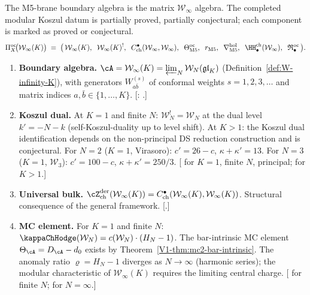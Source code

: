 \begin{conjecture}
\label{comp:platonic-M5}
The M5-brane boundary algebra is the matrix $\mathcal{W}_\infty$
algebra. The completed modular Koszul datum is partially proved,
partially conjectural; each component is marked as proved or conjectural.
\begin{equation}\label{eq:platonic-M5}
\Pi^{\mathrm{oc}}_X\!\bigl(\mathcal{W}_\infty(K)\bigr)
\;=\;
\bigl(\,
\mathcal{W}_\infty(K),\;\;
\mathcal{W}_\infty(K)^!,\;\;
C^\bullet_{\mathrm{ch}}(\mathcal{W}_\infty, \mathcal{W}_\infty),\;\;
\Theta^{\mathrm{oc}}_{\mathrm{M5}},\;\;
r_{\mathrm{M5}},\;\;
\nabla^{\mathrm{hol}}_{\mathrm{M5}},\;\;
\HH^{\mathrm{ch}}_\bullet(\mathcal{W}_\infty),\;\;
\mathfrak{R}^{\mathrm{oc}}_\bullet
\,\bigr).
\end{equation}
\begin{enumerate}[label=\textup{(\roman*)},nosep]
\item \textbf{Boundary algebra.}
 $\cA = \mathcal{W}_\infty(K) = \varprojlim_N \mathcal{W}_N(\mathfrak{gl}_K)$
 \textup{(}Definition~\textup{\ref{def:W-infinity-K}}\textup{)},
 with generators $W^{(s)}_{a\bar b}$ of conformal weights
 $s = 1, 2, 3, \ldots$ and matrix indices $a, \bar b \in \{1, \ldots, K\}$.
 \textup{[\ClaimStatusProvedElsewhere: \cite{ProchazkRapcak2018}.]}

\item \textbf{Koszul dual.}
 At $K = 1$ and finite $N$:
 $\mathcal{W}_N^! = \mathcal{W}_N$ at the dual level
 $k' = -N - k$ (self-Koszul-duality up to level shift).
At $K > 1$: the Koszul dual identification depends on the
non-principal DS reduction construction and is conjectural.
 For $N = 2$ ($K = 1$, Virasoro): $c' = 26 - c$, $\kappa + \kappa' = 13$.
 For $N = 3$ ($K = 1$, $\mathcal{W}_3$): $c' = 100 - c$,
 $\kappa + \kappa' = 250/3$.
 \textup{[\ClaimStatusProvedHere{} for $K = 1$, finite $N$, principal;
 \ClaimStatusConjectured{} for $K > 1$.]}

\item \textbf{Universal bulk.}
 $\cZ^{\mathrm{der}}_{\mathrm{ch}}(\mathcal{W}_\infty(K))
 = C^\bullet_{\mathrm{ch}}(\mathcal{W}_\infty(K), \mathcal{W}_\infty(K))$.
 Structural consequence of the general framework.
 \textup{[\ClaimStatusProvedHere.]}

\item \textbf{MC element.}
 For $K = 1$ and finite $N$:
 $\kappaChHodge(\mathcal{W}_N) = c(\mathcal{W}_N) \cdot (H_N - 1)$.
 The bar-intrinsic MC element $\Theta_\cA = D_\cA - d_0$ exists
 by Theorem~\textup{\ref*{V1-thm:mc2-bar-intrinsic}}.
 The anomaly ratio $\varrho = H_N - 1$ diverges as $N \to \infty$
 (harmonic series); the modular characteristic of
 $\mathcal{W}_\infty(K)$ requires the limiting central charge.
 \textup{[\ClaimStatusProvedHere{} for finite $N$;
 \ClaimStatusConjectured{} for $N = \infty$.]}


\end{enumerate}
\end{conjecture}
